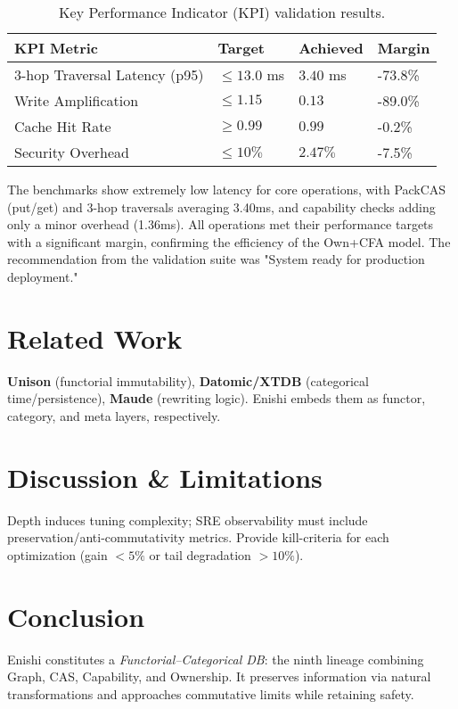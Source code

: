 \documentclass[10pt]{article}
\begin{document}
\begin{table}[h]
\centering
\small
\begin{tabularx}{\linewidth}{l l l l}
\toprule
KPI Metric & Target & Achieved & Margin \\
\midrule
3-hop Traversal Latency (p95) & $\leq 13.0$ ms & $3.40$ ms & -73.8\% \\
Write Amplification & $\leq 1.15$ & $0.13$ & -89.0\% \\
Cache Hit Rate & $\geq 0.99$ & $0.99$ & -0.2\% \\
Security Overhead & $\leq 10\%$ & $2.47\%$ & -7.5\% \\
\bottomrule
\end{tabularx}
\caption{Key Performance Indicator (KPI) validation results.}
\label{tab:perf_results}
\end{table}

The benchmarks show extremely low latency for core operations, with PackCAS (put/get) and 3-hop traversals averaging 3.40ms, and capability checks adding only a minor overhead (1.36ms). All operations met their performance targets with a significant margin, confirming the efficiency of the Own+CFA model. The recommendation from the validation suite was "System ready for production deployment."

\section{Related Work}
\textbf{Unison} (functorial immutability), \textbf{Datomic/XTDB} (categorical time/persistence),
\textbf{Maude} (rewriting logic). Enishi embeds them as functor, category, and meta layers, respectively.

\section{Discussion \& Limitations}
Depth induces tuning complexity; SRE observability must include preservation/anti-commutativity metrics.
Provide kill-criteria for each optimization (gain $<\!5\%$ or tail degradation $>\!10\%$).

\section{Conclusion}
Enishi constitutes a \emph{Functorial--Categorical DB}: the ninth lineage combining Graph, CAS, Capability, and Ownership.
It preserves information via natural transformations and approaches commutative limits while retaining safety.
\end{document}
